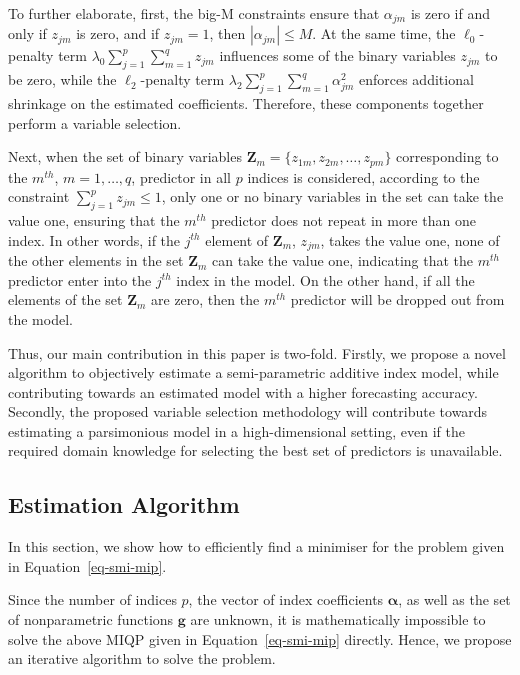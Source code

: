 \documentclass[11pt,a4paper,]{article}
\begin{document}
To further elaborate, first, the big-M constraints ensure that
\(\alpha_{jm}\) is zero if and only if \(z_{jm}\) is zero, and if
\(z_{jm} = 1\), then \(\left |\alpha_{jm}\right | \le M\). At the same
time, the \(\ell_{0}\)-penalty term
\(\lambda_{0}\sum_{j = 1}^{p}\sum_{m = 1}^{q}z_{jm}\) influences some of
the binary variables \(z_{jm}\) to be zero, while the
\(\ell_{2}\)-penalty term
\(\lambda_{2}\sum_{j = 1}^{p}\sum_{m = 1}^{q}\alpha_{jm}^{2}\) enforces
additional shrinkage on the estimated coefficients. Therefore, these
components together perform a variable selection.

Next, when the set of binary variables
\(\bm{Z}_{m} = \{z_{1m}, z_{2m}, \dots, z_{pm}\}\) corresponding to the
\(m^{th}\), \(m = 1, \dots, q\), predictor in all \(p\) indices is
considered, according to the constraint
\(\sum_{j = 1}^{p}z_{jm} \le 1\), only one or no binary variables in the
set can take the value one, ensuring that the \(m^{th}\) predictor does
not repeat in more than one index. In other words, if the \(j^{th}\)
element of \(\bm{Z}_{m}\), \(z_{jm}\), takes the value one, none of the
other elements in the set \(\bm{Z}_{m}\) can take the value one,
indicating that the \(m^{th}\) predictor enter into the \(j^{th}\) index
in the model. On the other hand, if all the elements of the set
\(\bm{Z}_{m}\) are zero, then the \(m^{th}\) predictor will be dropped
out from the model.

Thus, our main contribution in this paper is two-fold. Firstly, we
propose a novel algorithm to objectively estimate a semi-parametric
additive index model, while contributing towards an estimated model with
a higher forecasting accuracy. Secondly, the proposed variable selection
methodology will contribute towards estimating a parsimonious model in a
high-dimensional setting, even if the required domain knowledge for
selecting the best set of predictors is unavailable.

\hypertarget{estimation-algorithm}{%
\subsection{Estimation Algorithm}\label{estimation-algorithm}}

In this section, we show how to efficiently find a minimiser for the
problem given in Equation~\ref{eq-smi-mip}.

Since the number of indices \(p\), the vector of index coefficients
\(\bm{\alpha}\), as well as the set of nonparametric functions
\(\bm{g}\) are unknown, it is mathematically impossible to solve the
above MIQP given in Equation~\ref{eq-smi-mip} directly. Hence, we
propose an iterative algorithm to solve the problem.
\end{document}
